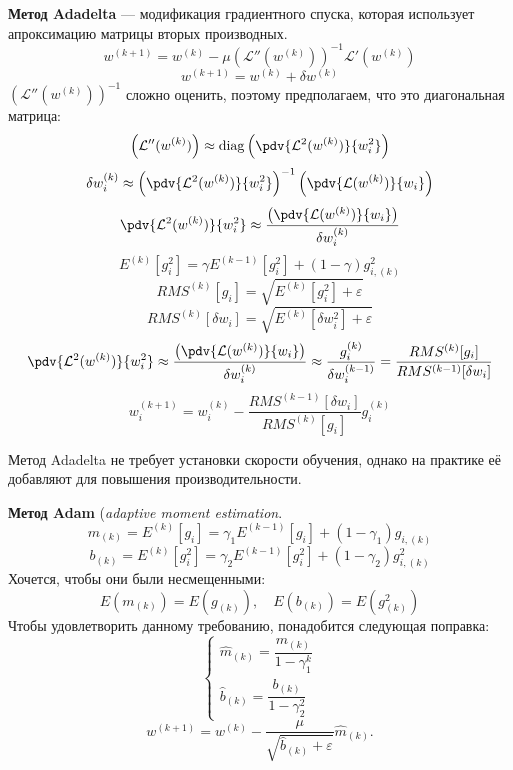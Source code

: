 \begin{definition}
    \textbf{Метод Adadelta} --- модификация градиентного спуска, которая использует апроксимацию матрицы вторых производных.
    \[
        w^{(k+1)}=w^{(k)}-\mu\left(\mathcal{L}''(w^{(k)})\right)^{-1}\mathcal{L}'(w^{(k)})
    \]
    \[
        w^{(k+1)}=w^{(k)}+\delta w^{(k)}
    \]
    $\left(\mathcal{L}''(w^{(k)})\right)^{-1}$ сложно оценить, поэтому предполагаем, что это диагональная матрица:
    \[
        \left(\mathcal{L}''(w^{(k)})\right)\approx\mathrm{diag}\left(\pdv{\mathcal{L}^2(w^{(k)})}{w_i^2}\right)
    \]
    \[
        \delta w_i^{(k)}\approx\left(\pdv{\mathcal{L}^2(w^{(k)})}{w_i^2}\right)^{-1}\left(\pdv{\mathcal{L}(w^{(k)})}{w_i}\right)
    \]
    \[
        \pdv{\mathcal{L}^2(w^{(k)})}{w_i^2}\approx\dfrac{\left(\pdv{\mathcal{L}(w^{(k)})}{w_i}\right)}{\delta w_i^{(k)}}
    \]
    \[
        E^{(k)}[g_i^2]=\gamma E^{(k-1)}[g_i^2]+(1-\gamma)g_{i,(k)}^2
    \]
    \[
        RMS^{(k)}[g_i]=\sqrt{E^{(k)}[g_i^2]+\varepsilon}
    \]
    \[
        RMS^{(k)}[\delta w_i]=\sqrt{E^{(k)}[\delta w_i^2]+\varepsilon}
    \]
    \[
        \pdv{\mathcal{L}^2(w^{(k)})}{w_i^2}\approx\dfrac{\left(\pdv{\mathcal{L}(w^{(k)})}{w_i}\right)}{\delta w_i^{(k)}}\approx\dfrac{g_i^{(k)}}{\delta w_i^{(k-1)}}=\dfrac{RMS^{(k)}[g_i]}{RMS^{(k-1)}[\delta w_i]}
    \]
    \[
        w^{(k+1)}_i=w_i^{(k)}-\dfrac{RMS^{(k-1)}[\delta w_i]}{RMS^{(k)}[g_i]}g_i^{(k)}
    \]
\end{definition}

\begin{remark}
    Метод Adadelta не требует установки скорости обучения, однако на практике её добавляют для повышения производительности.
\end{remark}

\begin{definition}
    \textbf{Метод Adam} (\textit{adaptive moment estimation}.
    \[
        m_{(k)}=E^{(k)}[g_i]=\gamma_1E^{(k-1)}[g_i]+(1-\gamma_1)g_{i,(k)}
    \]
    \[
        b_{(k)}=E^{(k)}[g_i^2]=\gamma_2E^{(k-1)}[g_i^2]+(1-\gamma_2)g_{i,(k)}^2
    \]
    Хочется, чтобы они были несмещенными:
    \[
        E(m_{(k)})=E(g_{(k)}),\quad E(b_{(k)})=E(g_{(k)}^2) 
    \]
    Чтобы удовлетворить данному требованию, понадобится следующая поправка:
    \begin{equation*}
        \begin{cases}
            \widehat{m}_{(k)}=\dfrac{m_{(k)}}{1-\gamma_1^k}
            \\
            \widehat{b}_{(k)}=\dfrac{b_{(k)}}{1-\gamma_2^2}
        \end{cases}
    \end{equation*}
    \[
        w^{(k+1)}=w^{(k)}-\dfrac{\mu}{\sqrt{\widehat{b}_{(k)}+\varepsilon}}\widehat{m}_{(k)}.
    \]
\end{definition}

